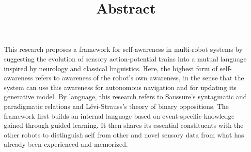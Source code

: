 \documentclass[a4paper]{article}
\title{Abstract}
\date{}
\begin{document}
    \maketitle
    This research proposes a framework for self-awareness in multi-robot systems by suggesting the evolution of sensory action-potential trains into a mutual language inspired by neurology and classical linguistics. Here, the highest form of self-awareness refers to awareness of the robot's own awareness, in the sense that the system can use this awareness for autonomous navigation and for updating its generative model. By language, this research refers to Saussure’s syntagmatic and paradigmatic relations and Lévi-Strauss’s theory of binary oppositions. The framework first builds an internal language based on event-specific knowledge gained through guided learning. It then shares its essential constituents with the other robots to distinguish self from other and novel sensory data from what has already been experienced and memorized.
\end{document}
